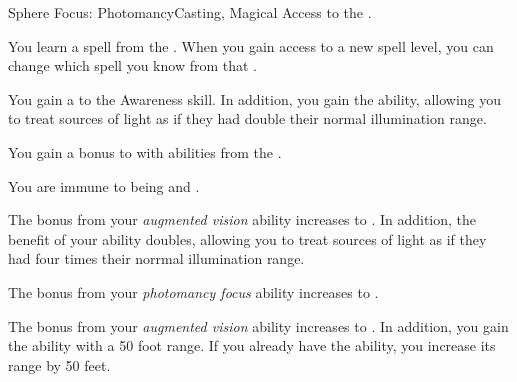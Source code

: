     \begin{feat}{Sphere Focus: Photomancy}{Casting, Magical}
        \featpre Access to the  .

         You learn a spell from the  .
        When you gain access to a new spell level, you can change which spell you know from that .

         You gain a   to the Awareness skill.
        In addition, you gain the  ability, allowing you to treat sources of light as if they had double their normal illumination range.

         You gain a  bonus to  with abilities from the  .

         You are immune to being  and .

         The bonus from your \textit{augmented vision} ability increases to .
        In addition, the benefit of your  ability doubles, allowing you to treat sources of light as if they had four times their norrmal illumination range.

         The bonus from your \textit{photomancy focus} ability increases to .

         The bonus from your \textit{augmented vision} ability increases to .
        In addition, you gain the  ability with a 50 foot range.
        If you already have the  ability, you increase its range by 50 feet.
    \end{feat}

